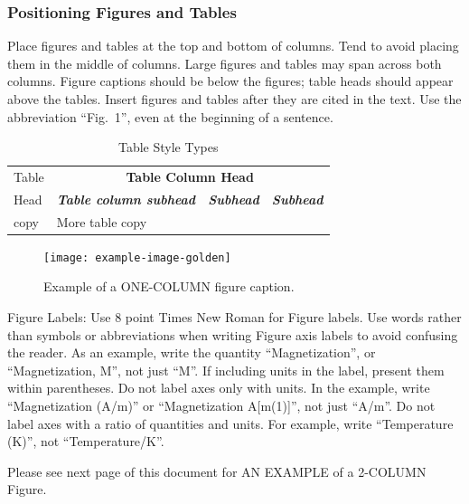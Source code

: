 \documentclass[conference,a4paper,flushend]{neutr}
\begin{document}
\subsubsection{Positioning Figures and Tables}
Place figures and tables at the top and bottom of columns. Tend to avoid placing them in the middle of columns. Large figures and tables may span across both columns. Figure captions should be below the figures; table heads should appear above the tables. Insert figures and tables after they are cited in the text. Use the abbreviation “Fig.~1”, even at the beginning of a sentence.

\begin{table}[htbp]
\caption{Table Style Types}
\renewcommand{\arraystretch}{1.5} %
\begin{tabular}{|l|l|l|l|}
\hline
Table & \multicolumn{3}{c|}{\textbf{Table Column Head}} \\ \cline{2-4}
Head & \textbf{\emph{Table column subhead}}  & \textbf{\emph{Subhead}} & \textbf{\emph{Subhead}} \\ \hline
copy & More table copy & ~ & ~ \\ \hline
\end{tabular}
\end{table}


\begin{figure}[htbp]
    \centering
    \texttt{[image: example-image-golden]}
    \caption{Example of a ONE-COLUMN figure caption.}
\end{figure}


Figure Labels: Use 8 point Times New Roman for Figure labels. Use words rather than symbols or abbreviations when writing Figure axis labels to avoid confusing the reader. As an example, write the quantity “Magnetization”, or “Magnetization, M”, not just “M”. If including units in the label, present them within parentheses. Do not label axes only with units. In the example, write “Magnetization (A/m)” or “Magnetization {A[m(1)]}”, not just “A/m”. Do not label axes with a ratio of quantities and units. For example, write “Temperature (K)”, not “Temperature/K”.

Please see next page of this document for AN EXAMPLE of a 2-COLUMN Figure.

\end{document}
